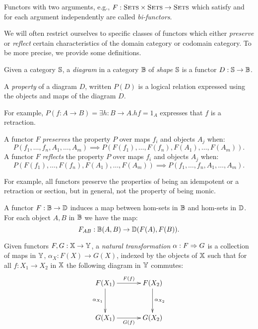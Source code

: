 Functors with two arguments, e.g., $F:\textsc{Sets} \times \textsc{Sets} \to \textsc{Sets}$ which satisfy  and
 for each argument independently are called \emph{bi-functors}.


We will often restrict ourselves to specific classes of functors which either \emph{preserve} or
\emph{reflect} certain characteristics of the domain category or codomain category. To be more
precise, we provide some definitions.

\begin{definition}\label{def:diagram_in_a_category}
  Given a category $\mathbb{S}$, a \emph{diagram}
  in a category $\mathbb{B}$ of \emph{shape} $\mathbb{S}$ is a functor $D:\mathbb{S} \to \mathbb{B}$.
\end{definition}

\begin{definition}\label{def:property_of_a_diagram}
  A \emph{property} of a diagram $D$, written $P(D)$ is a logical relation expressed using the
  objects and maps of the diagram $D$.
\end{definition}

For example,   $P(f:A \to B) = \exists h : B \to A. h f = 1_A$ expresses that $f$ is a retraction.

\begin{definition}\label{def:functor_preserving_and_reflecting_a_property}
  A functor $F$ \emph{preserves} the property $P$ over maps $f_i$ and objects $A_j$ when:
  \[
     P(f_1,\ldots,f_n, A_1,\ldots,A_m) \implies P(F(f_1),\ldots,F(f_n), F(A_1),\ldots,F(A_m)).
  \]
  A functor $F$ \emph{reflects} the property $P$ over maps $f_i$ and objects $A_j$ when:
  \[
    P(F(f_1),\ldots,F(f_n), F(A_1),\ldots,F(A_m)) \implies P(f_1,\ldots,f_n, A_1,\ldots,A_m).
  \]
\end{definition}

For example, all functors preserve the properties of being an idempotent or a retraction or section,
but in general, not the property of being monic.

A functor $F:\mathbb{B} \to \mathbb{D}$ induces a map between hom-sets in $\mathbb{B}$ and hom-sets in $\mathbb{D}$. For
each object $A,B$ in $\mathbb{B}$ we have the map:
\[
  F_{AB} : \mathbb{B}(A,B) \to \mathbb{D}(F(A),F(B)).
\]

\begin{definition}\label{def:natural_transformation}
  Given functors $F,G:\mathbb{X} \to \mathbb{Y}$, a \emph{natural transformation} $\alpha:F \Rightarrow G$ is a collection
  of maps in $\mathbb{Y}$, $\alpha_X : F(X) \to G(X)$, indexed by the objects of $\mathbb{X}$ such that for all
  $f:X_1 \to X_2$ in $\mathbb{X}$ the following diagram in $\mathbb{Y}$ commutes:
  \[\xymatrix @R+10pt @C+10pt{
      F(X_1) \ar[r]^{F(f)} \ar[d]_{\alpha_{X_1}} & F(X_2) \ar[d]^{\alpha_{X_2}}\\
      G(X_1) \ar[r]_{G(f)} &  G(X_2)
    }
  \]
\end{definition}

